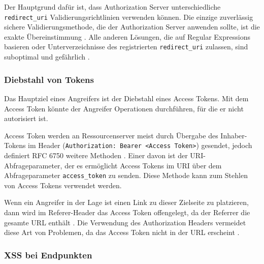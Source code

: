 Der Hauptgrund dafür ist, dass Authorization Server unterschiedliche \texttt{redirect\_uri} Validierungsrichtlinien verwenden können. Die einzige zuverlässig sichere Validierungsmethode, die der Authorization Server anwenden sollte, ist die exakte Übereinstimmung \cite{SSEB_OAuth2inAction}. Alle anderen Lösungen, die auf Regular Expressions basieren oder Unterverzeichnisse des registrierten \texttt{redirect\_uri} zulassen, sind suboptimal und gefährlich \cite{SSEB_OAuth2inAction}.

\subsubsection{Diebstahl von Tokens}

Das Hauptziel eines Angreifers ist der Diebstahl eines Access Tokens. Mit dem Access Token könnte der Angreifer Operationen durchführen, für die er nicht autorisiert ist. 

Access Token werden an Ressourcenserver meist durch Übergabe des Inhaber-Tokens im Header (\texttt{Authorization: Bearer <Access Token>}) gesendet, jedoch definiert RFC 6750 weitere Methoden \cite{SSEB_RFC6750}. Einer davon ist der URI-Abfrageparameter, der es ermöglicht Access Tokens im URI über dem Abfrageparameter \texttt{access\_token} zu senden. Diese Methode kann zum Stehlen von Access Tokens verwendet werden. 

Wenn ein Angreifer in der Lage ist einen Link zu dieser Zielseite zu platzieren, dann wird im Referer-Header das Access Token offengelegt, da der Referrer die gesamte URL enthält  \cite{SSEB_OAuth2inAction}. Die Verwendung des Authorization Headers vermeidet diese Art von Problemen, da das Access Token nicht in der URL erscheint \cite{SSEB_OAuth2inAction}.


\subsubsection{XSS bei Endpunkten}

